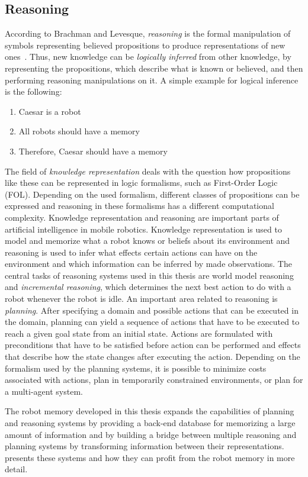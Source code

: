 \subsection{Reasoning}
\label{sec:reasoning}
According to Brachman and Levesque, \emph{reasoning} is the formal
manipulation of symbols representing believed propositions to
produce representations of new ones~\cite{kr-book}. Thus, new
knowledge can be \emph{logically inferred} from other knowledge, by
representing the propositions, which describe what is known or
believed, and then performing reasoning manipulations on it.
A simple example for logical inference is the following:
\begin{enumerate}
\item Caesar is a robot
\item All robots should have a memory
\item Therefore, Caesar should have a memory
\end{enumerate}
The field of \emph{knowledge representation} deals with the question
how propositions like these can be represented in logic formalisms,
such as First-Order Logic (FOL). 
Depending on the used formalism, different classes of propositions can
be expressed and reasoning in these formalisms has a different
computational complexity. Knowledge representation and reasoning are
important parts of artificial intelligence in mobile
robotics. Knowledge representation is used to model and memorize what
a robot knows or beliefs about its environment and reasoning is used
to infer what effects certain actions can have on the environment and
which information can be inferred by made observations. The central
tasks of reasoning systems used in this thesis are world model
reasoning and \emph{incremental reasoning}, which determines the next best
action to do with a robot whenever the robot is idle. An important
area related to reasoning is \emph{planning}. After specifying a
domain and possible actions that can be executed in the domain,
planning can yield a sequence of actions that have to be executed to
reach a given goal state from an initial state. Actions are formulated
with preconditions that have to be satisfied before action can be
performed and effects that describe how the state changes after
executing the action. Depending on the formalism used by the planning
systems, it is possible to minimize costs associated with actions,
plan in temporarily constrained environments, or plan for a multi-agent
system.

The robot memory developed in this thesis expands the capabilities of
planning and reasoning systems by providing a back-end database for
memorizing a large amount of information and by building a bridge
between multiple reasoning and planning systems by transforming
information between their representations. 
presents these systems and how they can profit from the robot memory
in more detail.

